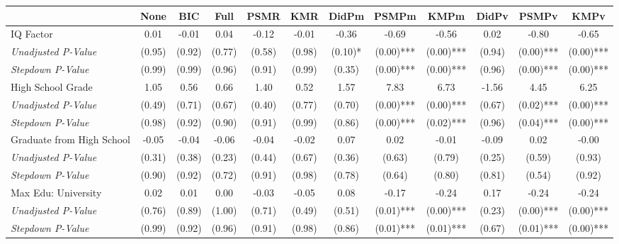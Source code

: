 \begin{tabular}{l c c c c c c c c c c c}
\toprule
 & None & BIC & Full & PSMR & KMR & DidPm & PSMPm & KMPm & DidPv & PSMPv & KMPv \\
\midrule
IQ Factor & 0.01 & -0.01 & 0.04 & -0.12 & -0.01 & -0.36 & -0.69 & -0.56 & 0.02 & -0.80 & -0.65 \\
\quad \textit{Unadjusted P-Value} & (0.95) & (0.92) & (0.77) & (0.58) & (0.98) & (0.10)* & (0.00)*** & (0.00)*** & (0.94) & (0.00)*** & (0.00)*** \\
\quad \textit{Stepdown P-Value} & (0.99) & (0.99) & (0.96) & (0.91) & (0.99) & (0.35) & (0.00)*** & (0.00)*** & (0.96) & (0.00)*** & (0.00)*** \\
High School Grade & 1.05 & 0.56 & 0.66 & 1.40 & 0.52 & 1.57 & 7.83 & 6.73 & -1.56 & 4.45 & 6.25 \\
\quad \textit{Unadjusted P-Value} & (0.49) & (0.71) & (0.67) & (0.40) & (0.77) & (0.70) & (0.00)*** & (0.00)*** & (0.67) & (0.02)*** & (0.00)*** \\
\quad \textit{Stepdown P-Value} & (0.98) & (0.92) & (0.90) & (0.91) & (0.99) & (0.86) & (0.00)*** & (0.02)*** & (0.96) & (0.04)*** & (0.00)*** \\
Graduate from High School & -0.05 & -0.04 & -0.06 & -0.04 & -0.02 & 0.07 & 0.02 & -0.01 & -0.09 & 0.02 & -0.00 \\
\quad \textit{Unadjusted P-Value} & (0.31) & (0.38) & (0.23) & (0.44) & (0.67) & (0.36) & (0.63) & (0.79) & (0.25) & (0.59) & (0.93) \\
\quad \textit{Stepdown P-Value} & (0.90) & (0.92) & (0.72) & (0.91) & (0.98) & (0.78) & (0.64) & (0.80) & (0.81) & (0.54) & (0.92) \\
Max Edu: University & 0.02 & 0.01 & 0.00 & -0.03 & -0.05 & 0.08 & -0.17 & -0.24 & 0.17 & -0.24 & -0.24 \\
\quad \textit{Unadjusted P-Value} & (0.76) & (0.89) & (1.00) & (0.71) & (0.49) & (0.51) & (0.01)*** & (0.00)*** & (0.23) & (0.00)*** & (0.00)*** \\
\quad \textit{Stepdown P-Value} & (0.99) & (0.92) & (0.96) & (0.91) & (0.98) & (0.86) & (0.01)*** & (0.01)*** & (0.67) & (0.01)*** & (0.00)*** \\
\bottomrule
\end{tabular}
